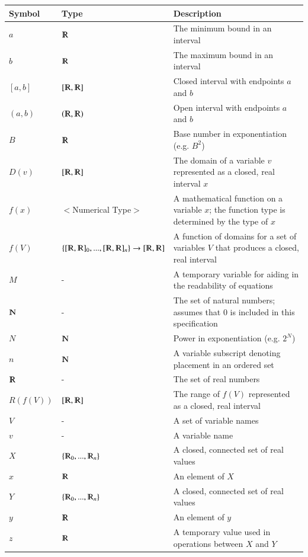 \documentclass[12pt]{article}
\begin{document}
\renewcommand{\arraystretch}{1.2}
\noindent \begin{longtable*}{m{1.5cm} m{5.3cm} m{8.2cm}} \toprule
\textbf{Symbol}  & \textbf{Type} & \textbf{Description}\\
\midrule 
$a$ & $\varmathbb{R}$ & The minimum bound in an interval\\
$b$ & $\varmathbb{R}$ & The maximum bound in an interval\\
$[a,b]$ & $[\varmathbb{R}, \varmathbb{R}]$ & Closed interval with endpoints $a$ 
and $b$\\
$(a,b)$ & $(\varmathbb{R}, \varmathbb{R})$ & Open interval with endpoints $a$ 
and $b$\\
$B$ & $\varmathbb{R}$ & Base number in exponentiation (e.g. $B^2$)\\
$D(v)$ & $[\varmathbb{R}, \varmathbb{R}]$ & The domain of a variable $v$ 
represented as a closed, real interval $x$\\
$f(x)$ & $<$Numerical Type$>$ & A mathematical function on a variable $x$; the 
function type is determined by the type of $x$\\
$f(V)$ & $\{[\varmathbb{R}, \varmathbb{R}]_0, ..., [\varmathbb{R}, 
\varmathbb{R}]_n\} \rightarrow [\varmathbb{R}, 
\varmathbb{R}]$ & A function of domains for a set of variables $V$ that 
produces a closed, real interval\\
$M$ & - & A temporary variable for aiding in the readability of equations\\
$\varmathbb{N}$ & - & The set of natural numbers; assumes that $0$ is included 
in this specification\\
$N$ & $\varmathbb{N}$ & Power in exponentiation (e.g. $2^N$) \\
$n$ & $\varmathbb{N}$ & A variable subscript denoting placement in an ordered 
set\\
$\varmathbb{R}$ & - & The set of real numbers\\
$R(f(V))$ & $[\varmathbb{R}, \varmathbb{R}]$ & The range of $f(V)$ represented 
as a closed, real interval\\
$V$ & - & A set of variable names\\
$v$ & - & A variable name\\
$X$ & $\{\varmathbb{R}_0, ..., \varmathbb{R}_n\}$ & A closed, connected set of 
real values\\
$x$ & $\varmathbb{R}$ & An element of $X$\\
$Y$ & $\{\varmathbb{R}_0, ..., \varmathbb{R}_n\}$ & A closed, connected set of 
real values\\
$y$ & $\varmathbb{R}$ & An element of $y$\\
$z$ & $\varmathbb{R}$ & A temporary value used in operations between $X$ and 
$Y$\\
\bottomrule
\end{longtable*}
\end{document}
